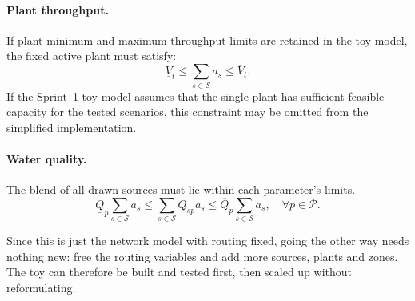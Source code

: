\documentclass[10pt]{article}
\begin{document}
\paragraph{Plant throughput.} If plant minimum and maximum throughput limits are retained in the toy model, the fixed active plant must satisfy:
\begin{equation}
    \underline{V}_t
    \leq
    \sum_{s \in \mathcal{S}} a_s
    \leq
    \overline{V}_t.
\end{equation}
If the Sprint~1 toy model assumes that the single plant has sufficient feasible capacity for the tested scenarios, this constraint may be omitted from the simplified implementation.

\paragraph{Water quality.} The blend of all drawn sources must lie within each parameter's limits.
\begin{equation}
    \underline{Q}_p \sum_{s \in \mathcal{S}} a_s
    \le \sum_{s \in \mathcal{S}} Q_{sp} a_s
    \le \overline{Q}_p \sum_{s \in \mathcal{S}} a_s,
    \quad \forall p \in \mathcal{P}.
\end{equation}

\begin{center}
\end{center}

\noindent Since this is just the network model with routing fixed, going the other way needs nothing new: free the routing variables and add more sources, plants and zones. The toy can therefore be built and tested first, then scaled up without reformulating.
\end{document}
